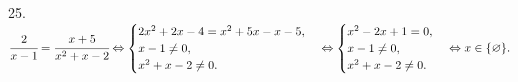 25. $\cfrac{2}{x-1}=\cfrac{x+5}{x^2+x-2}\Leftrightarrow\begin{cases}
2x^2+2x-4=x^2+5x-x-5,\\
x-1\neq0,\\ x^2+x-2\neq0.\end{cases}\Leftrightarrow  \begin{cases}
x^2-2x+1=0,\\
x-1\neq0,\\ x^2+x-2\neq0.\end{cases}\Leftrightarrow x\in\{\varnothing\}.$\\
